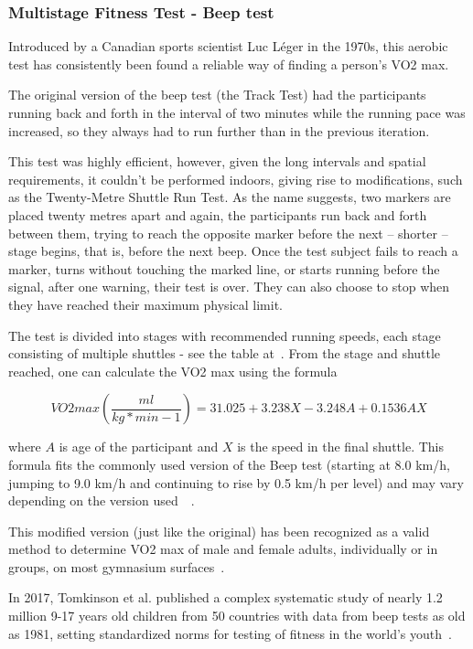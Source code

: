\subsubsection*{Multistage Fitness Test - Beep test}

Introduced by a Canadian sports scientist Luc Léger in the 1970s, this aerobic test has consistently been found a reliable way of finding a person's VO2 max.

The original version of the beep test (the Track Test) had the participants running back and forth in the interval of two minutes while the running pace was increased, so they always had to run further than in the previous iteration.

This test was highly efficient, however, given the long intervals and spatial requirements, it couldn't be performed indoors, giving rise to modifications, such as the Twenty-Metre Shuttle Run Test.
As the name suggests, two markers are placed twenty metres apart and again, the participants run back and forth between them, trying to reach the opposite marker before the next -- shorter -- stage begins, that is, before the next beep.
Once the test subject fails to reach a marker, turns without touching the marked line, or starts running before the signal, after one warning, their test is over.
They can also choose to stop when they have reached their maximum physical limit.

The test is divided into stages with recommended running speeds, each stage consisting of multiple shuttles - see the table at~\cite{beep-test-scoring-table}.
From the stage and shuttle reached, one can calculate the VO2 max using the formula

\[VO2max (\frac{ml}{kg*min-1}) = 31.025 + 3.238X - 3.248A + 0.1536AX\]

where $A$ is age of the participant and $X$ is the speed in the final shuttle.
This formula fits the commonly used version of the Beep test (starting at 8.0 km/h, jumping to 9.0 km/h and continuing to rise by 0.5 km/h per level) and may vary depending on the version used~\cite{beep-test-versions}~\cite{beep-test-20m-valid}.

This modified version (just like the original) has been recognized as a valid method to determine VO2 max of male and female adults, individually or in groups, on most gymnasium surfaces~\cite{beep-test-20m-valid}.

In 2017, Tomkinson et al. published a complex systematic study of nearly 1.2 million 9-17 years old children from 50 countries with data from beep tests as old as 1981,
setting standardized norms for testing of fitness in the world's youth~\cite{beep-test-youth-large-study}.


